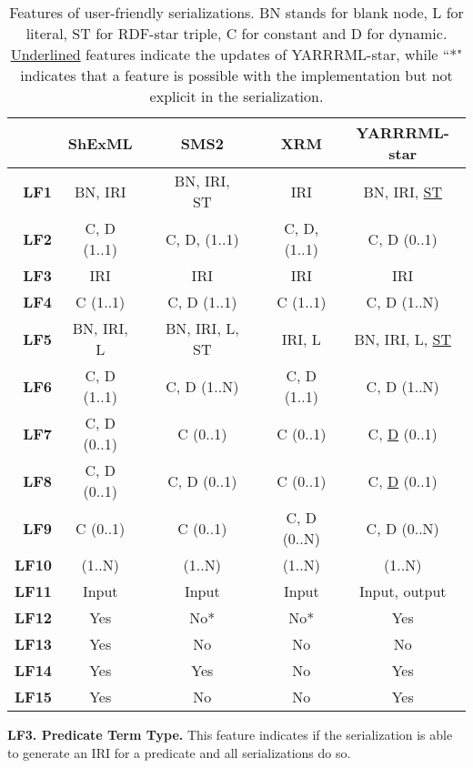 \begin{table}[t!]
\caption[Features of user-frienly serializations]{Features of user-friendly serializations. BN stands for blank node, L for literal, ST for RDF-star triple, C for constant and D for dynamic. \underline{Underlined} features indicate the updates of YARRRML-star, while
``*" indicates that a feature is possible with the implementation but not explicit in the serialization.}
\label{tab:chp5_lang-comparison}
\centering
\begin{tabular}{r|cccccc}
 & \textbf{ShExML} & & \textbf{SMS2} & & \textbf{XRM} & \textbf{YARRRML-star} \\ \midrule
\textbf{LF1}& BN, IRI & & BN, IRI, ST & & IRI& BN, IRI, \underline{ST}\\ \midrule
\textbf{LF2}& C, D (1..1) & & C, D, (1..1) & & C, D, (1..1) & C, D (0..1)\\ \midrule
\textbf{LF3}& IRI & & IRI & & IRI & IRI\\ \midrule
\textbf{LF4}& C (1..1) & & C, D (1..1) & & C (1..1) & C, D (1..N)\\ \midrule
\textbf{LF5} & BN, IRI, L & & BN, IRI, L, ST & & IRI, L & BN, IRI, L, \underline{ST} \\ \midrule
\textbf{LF6} & C, D (1..1) & & C, D (1..N) & & C, D (1..1) & C, D (1..N)\\ \midrule
\textbf{LF7} & C, D (0..1) & & C (0..1) & & C (0..1) & C, \underline{D} (0..1)\\ \midrule
\textbf{LF8}& C, D (0..1) & & C, D (0..1) & & C (0..1) & C, \underline{D} (0..1)\\ \midrule
\textbf{LF9}& C (0..1) & & C (0..1) & & C, D (0..N) & C, D (0..N)\\ \midrule
\textbf{LF10} & (1..N) & & (1..N) & & (1..N) & (1..N)\\ \midrule
\textbf{LF11} & Input & & Input & & Input & Input, output\\ \midrule
\textbf{LF12} & Yes & & No* & & No* & Yes\\ \midrule
\textbf{LF13}& Yes & & No & & No & No \\ \midrule
\textbf{LF14} & Yes & & Yes & & No & Yes\\ \midrule
\textbf{LF15}& Yes & & No & & No & Yes\\ \midrule
\end{tabular}
\end{table}


\textbf{LF3. Predicate Term Type.} 
This feature indicates if the serialization is able to generate an IRI for a predicate and all serializations do so.

